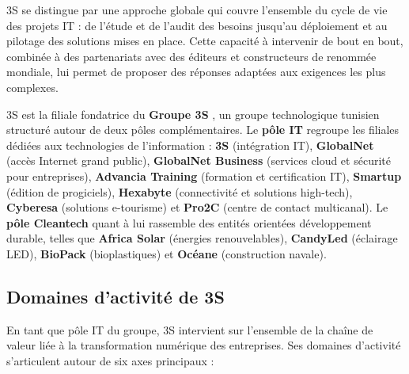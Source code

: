 3S se distingue par une approche globale qui couvre l'ensemble du cycle de vie des projets IT : de l'étude et de l'audit des besoins jusqu'au déploiement et au pilotage des solutions mises en place. Cette capacité à intervenir de bout en bout, combinée à des partenariats avec des éditeurs et constructeurs de renommée mondiale, lui permet de proposer des réponses adaptées aux exigences les plus complexes.

3S est la filiale fondatrice du \textbf{Groupe 3S} \cite{site3sgroup}, un groupe technologique tunisien structuré autour de deux pôles complémentaires. Le \textbf{pôle IT} regroupe les filiales dédiées aux technologies de l'information : \textbf{3S} (intégration IT), \textbf{GlobalNet} (accès Internet grand public), \textbf{GlobalNet Business} (services cloud et sécurité pour entreprises), \textbf{Advancia Training} (formation et certification IT), \textbf{Smartup} (édition de progiciels), \textbf{Hexabyte} (connectivité et solutions high-tech), \textbf{Cyberesa} (solutions e-tourisme) et \textbf{Pro2C} (centre de contact multicanal). Le \textbf{pôle Cleantech} quant à lui rassemble des entités orientées développement durable, telles que \textbf{Africa Solar} (énergies renouvelables), \textbf{CandyLed} (éclairage LED), \textbf{BioPack} (bioplastiques) et \textbf{Océane} (construction navale).




\subsection{Domaines d'activité de 3S}

En tant que pôle IT du groupe, 3S intervient sur l'ensemble de la chaîne de valeur liée à la transformation numérique des entreprises. Ses domaines d'activité s'articulent autour de six axes principaux :

